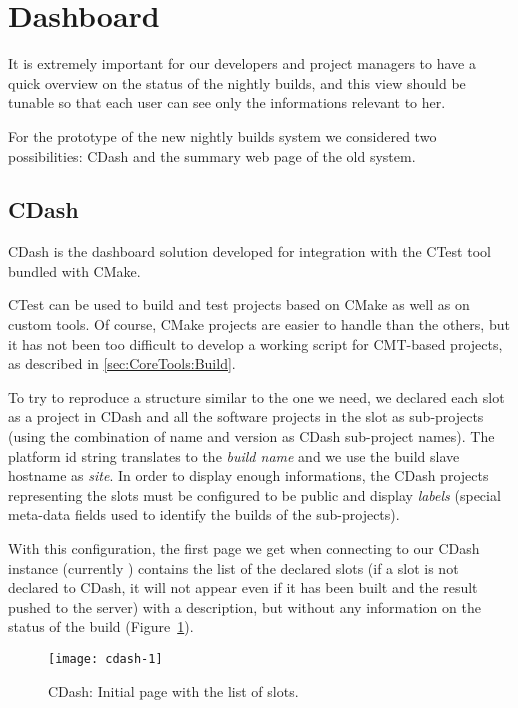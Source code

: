 \section{Dashboard}
\label{sec:Dashboard}
It is extremely important for our developers and project managers to have a
quick overview on the status of the nightly builds, and this view should be
tunable so that each user can see only the informations relevant to her.

For the prototype of the new nightly builds system we considered two
possibilities: CDash and the summary web page of the old system.

\subsection{CDash}
\label{Dashboard:CDash}
CDash is the dashboard solution developed for integration with the CTest tool
bundled with CMake.

CTest can be used to build and test projects based on CMake as well as on custom
tools.  Of course, CMake projects are easier to handle than the others, but it
has not been too difficult to develop a working script for CMT-based projects,
as described in \ref{sec:CoreTools:Build}.

To try to reproduce a structure similar to the one we need, we declared each
slot as a project in CDash and all the software projects in the slot as
sub-projects\cite{CMakeBook,CDashSubprojects} (using the combination of name and
version as CDash sub-project names).  The platform id string translates to the
\emph{build name} and we use the build slave hostname as \emph{site}.  In order
to display enough informations, the CDash projects representing the slots must
be configured to be public and display \emph{labels} (special meta-data fields
used to identify the builds of the sub-projects).

With this configuration, the first page we get when connecting to our CDash
instance (currently ) contains the
list of the declared slots (if a slot is not declared to CDash, it will not
appear even if it has been built and the result pushed to the server) with a
description, but without any information on the status of the build
(Figure~\ref{fig:cdash-home}).

\begin{figure}
  \begin{center}
    \texttt{[image: cdash-1]}
  \end{center}
  \caption{CDash: Initial page with the list of slots.}
  \label{fig:cdash-home}
\end{figure}

